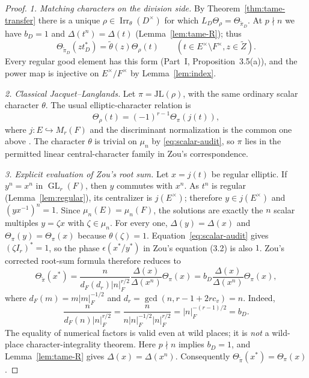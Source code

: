 \documentclass[11pt]{article}
\newcommand{\GL}{\operatorname{GL}}
\newcommand{\Irr}{\operatorname{Irr}}
\newcommand{\tZ}{\widetilde Z}
\newcommand{\JL}{\mathrm{JL}}
\theoremstyle{plain}
\theoremstyle{definition}
\begin{document}
\begin{proof}
\emph{1. Matching characters on the division side.}
By Theorem~\ref{thm:tame-transfer} there is a unique
$\rho\in\Irr_\theta(D^\times)$ for which
$L_D\Theta_\rho=\Theta_{\widetilde\pi_D}$.
At $p\nmid n$ we have $b_D=1$ and
$\Delta(t^n)=\Delta(t)$ (Lemma~\ref{lem:tame-R}); thus
\begin{equation}\label{eq:div-D2-step}
 \Theta_{\widetilde\pi_D}(z t_D^*)
   =\widetilde\theta(z)\Theta_\rho(t)
 \qquad(t\in E^\times\setminus F^\times,
            z\in\tZ).
\end{equation}
Every regular good element has this form (Part~I,
Proposition~3.5(a)), and the power map is injective on
$E^\times/F^\times$ by Lemma~\ref{lem:index}.

\emph{2. Classical Jacquet--Langlands.}
Let $\pi=\JL(\rho)$, with the same ordinary scalar character
$\theta$.  The usual elliptic-character relation is
\begin{equation}\label{eq:linear-D2-step}
 \Theta_\rho(t)=(-1)^{r-1}\Theta_\pi(j(t)),
\end{equation}
where $j:E\hookrightarrow M_r(F)$ and the discriminant
normalization is the common one above \cite{DKV}.
The character $\theta$ is trivial on $\mu_n$ by
\eqref{eq:scalar-audit}, so $\pi$ lies in the permitted
linear central-character family in Zou's correspondence.

\emph{3. Explicit evaluation of Zou's root sum.}
Let $x=j(t)$ be regular elliptic.  If $y^n=x^n$ in
$\GL_r(F)$, then $y$ commutes with $x^n$.  As $t^n$
is regular (Lemma~\ref{lem:regular}), its centralizer is
$j(E^\times)$; therefore $y\in j(E^\times)$ and
$(yx^{-1})^n=1$.  Since $\mu_n(E)=\mu_n(F)$, the
solutions are exactly the $n$ scalar multiples
$y=\zeta x$ with $\zeta\in\mu_n$.
For every one, $\Delta(y)=\Delta(x)$ and
$\Theta_\pi(y)=\Theta_\pi(x)$ because
$\theta(\zeta)=1$.  Equation~\eqref{eq:scalar-audit}
gives $(\zeta I_r)^*=1$, so the phase
$\epsilon(x^*/y^*)$ in Zou's equation (3.2) is also $1$.
Zou's corrected root-sum formula therefore reduces to
\begin{equation}\label{eq:zou-D2-step}
 \Theta_{\widetilde\pi}(x^*)
  =\frac{n}{d_F(d_r)|n|_F^{r/2}}
   \frac{\Delta(x)}{\Delta(x^n)}\Theta_\pi(x)
  =b_D\frac{\Delta(x)}{\Delta(x^n)}\Theta_\pi(x),
\end{equation}
where $d_F(m)=m|m|_F^{-1/2}$ and
$d_r=\gcd(n,r-1+2rc_v)=n$.  Indeed,
\[
 \frac{n}{d_F(n)|n|_F^{r/2}}
 =\frac{n}{n|n|_F^{-1/2}|n|_F^{r/2}}
 =|n|_F^{-(r-1)/2}=b_D.
\]
The equality of numerical factors is valid even at wild places;
it is \emph{not} a wild-place character-integrality theorem.
Here $p\nmid n$ implies $b_D=1$, and
Lemma~\ref{lem:tame-R} gives $\Delta(x)=\Delta(x^n)$.
Consequently $\Theta_{\widetilde\pi}(x^*)
=\Theta_\pi(x)$.


\end{proof}
\end{document}
